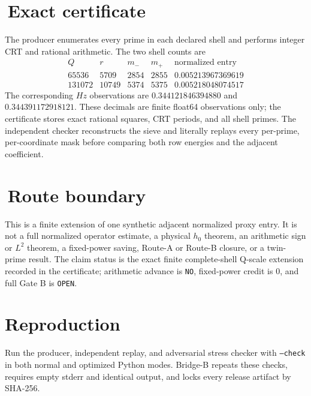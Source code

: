 \documentclass[11pt]{article}
\begin{document}
\section{\,Exact certificate}
The producer enumerates every prime in each declared shell and performs
integer CRT and rational arithmetic.  The two shell counts are
\[
\begin{array}{c|r|r|r|r}
Q&r&m_-&m_+&\text{normalized entry}\\ \hline
65536&5709&2854&2855&0.005213967369619\\
131072&10749&5374&5375&0.005218048074517
\end{array}
\]
The corresponding $Hz$ observations are $0.344121846394880$ and
$0.344391172918121$.  These decimals are finite float64 observations only;
the certificate stores exact rational squares, CRT periods, and all shell
primes.  The independent checker reconstructs the sieve and literally
replays every per-prime, per-coordinate mask before comparing both row
energies and the adjacent coefficient.

\section{\,Route boundary}
This is a finite extension of one synthetic adjacent normalized proxy entry.
It is not a full normalized operator estimate, a physical $h_0$ theorem, an
arithmetic sign or $L^2$ theorem, a fixed-power saving, Route-A or Route-B
closure, or a twin-prime result.  The claim status is the exact finite
complete-shell Q-scale extension recorded in the certificate;
arithmetic advance is \texttt{NO}, fixed-power credit is $0$, and full Gate B
is \texttt{OPEN}.

\section*{Reproduction}
Run the producer, independent replay, and adversarial stress checker with
\texttt{--check} in both normal and optimized Python modes.  Bridge-B repeats
these checks, requires empty stderr and identical output, and locks every
release artifact by SHA-256.
\end{document}
